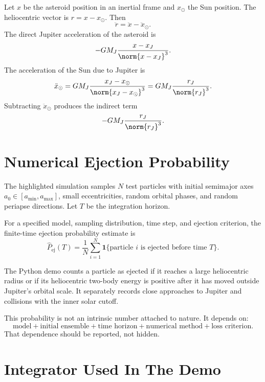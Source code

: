 \begin{derivation}
Let \(x\) be the asteroid position in an inertial frame and \(x_\odot\) the Sun
position. The heliocentric vector is \(r=x-x_\odot\). Then
\[
  \ddot r=\ddot x-\ddot x_\odot.
\]
The direct Jupiter acceleration of the asteroid is
\[
  -GM_J\frac{x-x_J}{\norm{x-x_J}^3}.
\]
The acceleration of the Sun due to Jupiter is
\[
  \ddot x_\odot=
  GM_J\frac{x_J-x_\odot}{\norm{x_J-x_\odot}^3}
  =
  GM_J\frac{r_J}{\norm{r_J}^3}.
\]
Subtracting \(\ddot x_\odot\) produces the indirect term
\[
  -GM_J\frac{r_J}{\norm{r_J}^3}.
\]
\end{derivation}

\section{Numerical Ejection Probability}
\label{sec:numerical-ejection-probability}

The highlighted simulation samples \(N\) test particles with initial semimajor
axes \(a_0\in[a_{\min},a_{\max}]\), small eccentricities, random orbital phases,
and random periapse directions. Let \(T\) be the integration horizon.

\begin{definition}
For a specified model, sampling distribution, time step, and ejection criterion,
the finite-time ejection probability estimate is
\[
  \widehat P_{\mathrm{ej}}(T)
  =
  \frac{1}{N}
  \sum_{i=1}^{N}\mathbf 1\{\text{particle \(i\) is ejected before time \(T\)}\}.
\]
\end{definition}

\begin{assumption}
The Python demo counts a particle as ejected if it reaches a large heliocentric
radius or if its heliocentric two-body energy is positive after it has moved
outside Jupiter's orbital scale. It separately records close approaches to
Jupiter and collisions with the inner solar cutoff.
\end{assumption}

This probability is not an intrinsic number attached to nature. It depends on:
\[
  \text{model}+\text{initial ensemble}+\text{time horizon}
  +\text{numerical method}+\text{loss criterion}.
\]
That dependence should be reported, not hidden.

\section{Integrator Used In The Demo}
\label{sec:asteroid-integrator}

